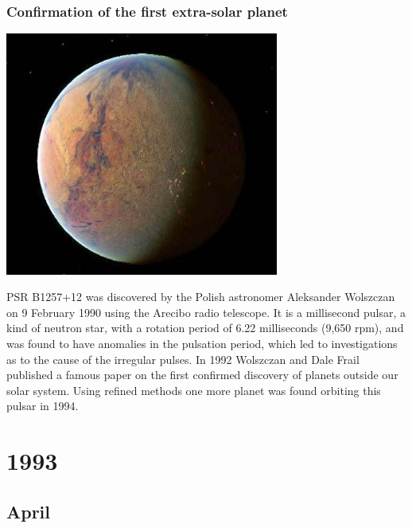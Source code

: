\documentclass[11pt]{report}
\begin{document}
\subsection{Confirmation of the first extra-solar planet}
\vspace{2mm}\begin{center}\includegraphics[width=9cm]{./img/PSR_B1257_12_C.jpg}\end{center}
PSR B1257+12 was discovered by the Polish astronomer Aleksander Wolszczan on 9 February 1990 using the Arecibo radio telescope. It is a millisecond pulsar, a kind of neutron star, with a rotation period of 6.22 milliseconds (9,650 rpm), and was found to have anomalies in the pulsation period, which led to investigations as to the cause of the irregular pulses. In 1992 Wolszczan and Dale Frail published a famous paper on the first confirmed discovery of planets outside our solar system. Using refined methods one more planet was found orbiting this pulsar in 1994.

\chapter{1993}
\section{April}
\end{document}
